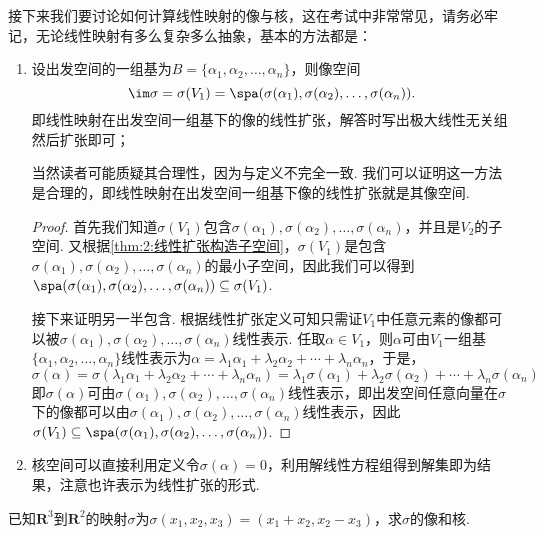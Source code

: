 接下来我们要讨论如何计算线性映射的像与核，这在考试中非常常见，请务必牢记，无论线性映射有多么复杂多么抽象，基本的方法都是：
\begin{enumerate}
    \item 设出发空间的一组基为$B=\{\alpha_1,\alpha_2,\ldots,\alpha_n\}$，则像空间
          \[\im \sigma=\sigma(V_1)=\spa(\sigma(\alpha_1),\sigma(\alpha_2),\ldots,\sigma(\alpha_n)).\]
          即线性映射在出发空间一组基下的像的线性扩张，解答时写出极大线性无关组然后扩张即可；

          当然读者可能质疑其合理性，因为与定义不完全一致. 我们可以证明这一方法是合理的，即线性映射在出发空间一组基下像的线性扩张就是其像空间.

          \begin{proof}
              首先我们知道$\sigma(V_1)$包含$\sigma(\alpha_1),\sigma(\alpha_2),\ldots,\sigma(\alpha_n)$，并且是$V_2$的子空间. 又根据\autoref{thm:2:线性扩张构造子空间}，$\sigma(V_1)$是包含$\sigma(\alpha_1),\sigma(\alpha_2),\ldots,\sigma(\alpha_n)$的最小子空间，因此我们可以得到$\spa(\sigma(\alpha_1),\sigma(\alpha_2),\ldots,\sigma(\alpha_n))\subseteq\sigma(V_1)$.

              接下来证明另一半包含. 根据线性扩张定义可知只需证$V_1$中任意元素的像都可以被$\sigma(\alpha_1),\sigma(\alpha_2),\ldots,\sigma(\alpha_n)$线性表示. 任取$\alpha\in V_1$，则$\alpha$可由$V_1$一组基$\{\alpha_1,\alpha_2,\ldots,\alpha_n\}$线性表示为$\alpha=\lambda_1\alpha_1+\lambda_2\alpha_2+\cdots+\lambda_n\alpha_n$，于是，
              \[\sigma(\alpha)=\sigma(\lambda_1\alpha_1+\lambda_2\alpha_2+\cdots+\lambda_n\alpha_n)=\lambda_1\sigma(\alpha_1)+\lambda_2\sigma(\alpha_2)+\cdots+\lambda_n\sigma(\alpha_n)\]
              即$\sigma(\alpha)$可由$\sigma(\alpha_1),\sigma(\alpha_2),\ldots,\sigma(\alpha_n)$线性表示，即出发空间任意向量在$\sigma$下的像都可以由$\sigma(\alpha_1),\sigma(\alpha_2),\ldots,\sigma(\alpha_n)$线性表示，因此$\sigma(V_1)\subseteq\spa(\sigma(\alpha_1),\sigma(\alpha_2),\ldots,\sigma(\alpha_n))$.
          \end{proof}

    \item 核空间可以直接利用定义令$\sigma(\alpha)=0$，利用解线性方程组得到解集即为结果，注意也许表示为线性扩张的形式.
\end{enumerate}

\begin{example}
    已知$\mathbf{R}^3$到$\mathbf{R}^2$的映射$\sigma$为$\sigma(x_1,x_2,x_3)=(x_1+x_2,x_2-x_3)$，求$\sigma$的像和核.
\end{example}

